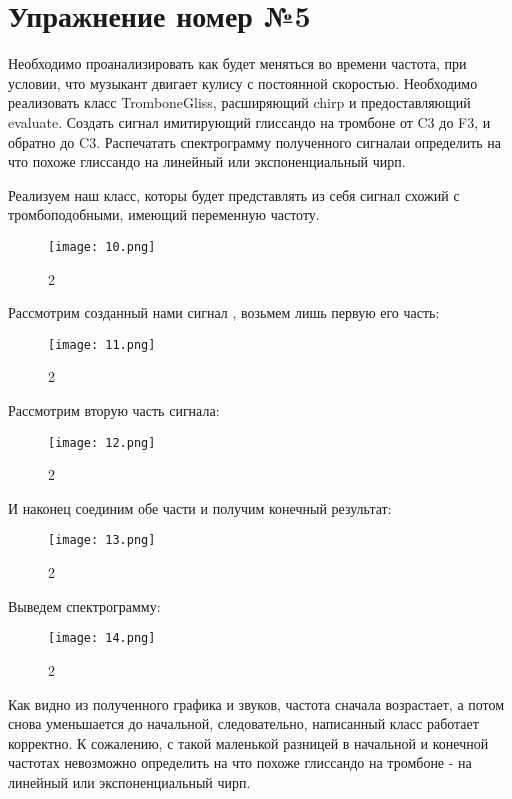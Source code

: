 \documentclass[10pt,a4paper,oneside]{article}
\begin{document}
\section{Упражнение номер №5}

Необходимо проанализировать как будет меняться во времени частота, при условии, что музыкант двигает кулису с постоянной скоростью. Необходимо реализовать класс TromboneGliss, расширяющий chirp и предоставляющий evaluate. Создать сигнал имитирующий глиссандо на тромбоне от C3 до F3, и обратно до C3. Распечатать спектрограмму полученного сигналаи определить на что похоже глиссандо на линейный или экспоненциальный чирп.

Реализуем наш класс, которы	 будет представлять из себя сигнал схожий с тромбоподобными, имеющий переменную частоту.

\begin{figure}[H]
        \centering
        \texttt{[image: 10.png]}
        \caption{2}
        \label{fig:first}
\end{figure}

Рассмотрим созданный нами сигнал , возьмем лишь первую его часть: 

\begin{figure}[H]
        \centering
        \texttt{[image: 11.png]}
        \caption{2}
        \label{fig:first}
\end{figure}

Рассмотрим вторую часть сигнала: 

\begin{figure}[H]
        \centering
        \texttt{[image: 12.png]}
        \caption{2}
        \label{fig:first}
\end{figure}

И наконец соединим обе части и получим конечный результат: 

\begin{figure}[H]
        \centering
        \texttt{[image: 13.png]}
        \caption{2}
        \label{fig:first}
\end{figure}

Выведем спектрограмму: 

\begin{figure}[H]
        \centering
        \texttt{[image: 14.png]}
        \caption{2}
        \label{fig:first}
\end{figure}

Как видно из полученного графика и звуков, частота сначала возрастает, а потом снова уменьшается до начальной, следовательно, написанный класс работает корректно. К сожалению, с такой маленькой разницей в начальной и конечной частотах невозможно определить на что похоже глиссандо на тромбоне - на линейный или экспоненциальный чирп.
\end{document}
